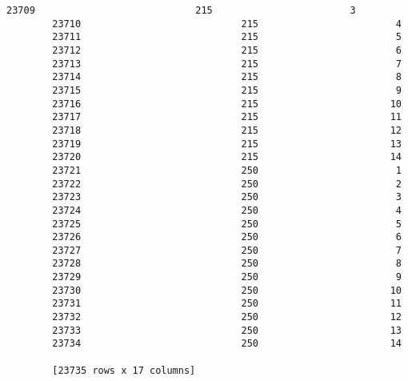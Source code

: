\documentclass[11pt]{article}
\begin{document}
\begin{Verbatim}[commandchars=\\\{\}]
        23709                            215                        3  
        23710                            215                        4  
        23711                            215                        5  
        23712                            215                        6  
        23713                            215                        7  
        23714                            215                        8  
        23715                            215                        9  
        23716                            215                       10  
        23717                            215                       11  
        23718                            215                       12  
        23719                            215                       13  
        23720                            215                       14  
        23721                            250                        1  
        23722                            250                        2  
        23723                            250                        3  
        23724                            250                        4  
        23725                            250                        5  
        23726                            250                        6  
        23727                            250                        7  
        23728                            250                        8  
        23729                            250                        9  
        23730                            250                       10  
        23731                            250                       11  
        23732                            250                       12  
        23733                            250                       13  
        23734                            250                       14  
        
        [23735 rows x 17 columns]
\end{Verbatim}
            

    
    
    
    
\end{document}
